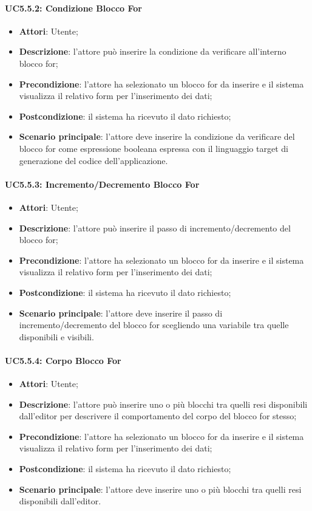 \paragraph{UC5.5.2: Condizione Blocco For}
\label{UC5.5.2}
\begin{itemize}
	\item \textbf{Attori}: Utente;
	\item \textbf{Descrizione}: l'attore può inserire la condizione da verificare all'interno blocco for;
	\item \textbf{Precondizione}: l'attore ha selezionato un blocco for da inserire e il sistema visualizza il relativo form per l'inserimento dei dati;
	\item \textbf{Postcondizione}: il sistema ha ricevuto il dato richiesto;
	\item \textbf{Scenario principale}: l'attore deve inserire la condizione da verificare del blocco for come espressione booleana espressa con il linguaggio target di generazione del codice dell'applicazione.
\end{itemize}

\paragraph{UC5.5.3: Incremento/Decremento Blocco For}
\label{UC5.5.3}
\begin{itemize}
	\item \textbf{Attori}: Utente;
	\item \textbf{Descrizione}: l'attore può inserire il passo di incremento/decremento del blocco for;
	\item \textbf{Precondizione}: l'attore ha selezionato un blocco for da inserire e il sistema visualizza il relativo form per l'inserimento dei dati;
	\item \textbf{Postcondizione}: il sistema ha ricevuto il dato richiesto;
	\item \textbf{Scenario principale}: l'attore deve inserire il passo di incremento/decremento del blocco for scegliendo una variabile tra quelle disponibili e visibili.
\end{itemize}

\paragraph{UC5.5.4: Corpo Blocco For}
\label{UC5.5.4}
\begin{itemize}
	\item \textbf{Attori}: Utente;
	\item \textbf{Descrizione}: l'attore può inserire uno o più blocchi tra quelli resi disponibili dall'editor per descrivere il comportamento del corpo del blocco for stesso;
	\item \textbf{Precondizione}: l'attore ha selezionato un blocco for da inserire e il sistema visualizza il relativo form per l'inserimento dei dati;
	\item \textbf{Postcondizione}: il sistema ha ricevuto il dato richiesto;
	\item \textbf{Scenario principale}: l'attore deve inserire uno o più blocchi tra quelli resi disponibili dall'editor.
\end{itemize}


